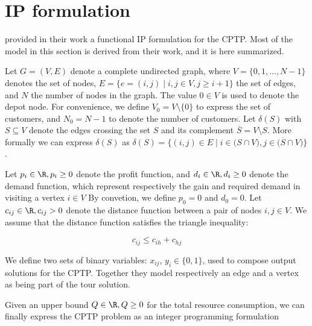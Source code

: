 \chapter{IP formulation}

\cite{Jepsen2014} provided in their work a functional IP formulation for the CPTP.
Most of the model in this section is derived from their work, and it is here summarized.

Let $G = \left(V, E \right)$ denote a complete undirected graph, where $V = \lbrace 0, 1, \dots, N - 1 \rbrace$ denotes the set of nodes,
$E = \lbrace  e = (i, j) \mid i,j \in V, j \ge i + 1 \rbrace$ the set of edges, and $N$ the number of nodes in the graph.
The value $0 \in V$ is used to denote the depot node.
For convenience, we define $V_0 = V \setminus \{0\}$ to express the set of customers, and $N_0 = N - 1$ to denote the number of customers.
Let $\delta(S)$ with $S \subseteq V$ denote the edges crossing the set $S$ and its complement $\overline{S} = V \setminus S$.
More formally we can express $\delta(S)$ as $\delta(S) = \lbrace (i, j) \in E \mid i \in \lparen S \cap V \rparen, j \in \lparen \overline{S} \cap V \rparen \rbrace$.

Let $p_{i} \in \R, p_{i} \ge 0$ denote the profit function, and $d_{i} \in \R, d_{i} \ge 0$ denote the demand function, which represent respectively the gain and required demand in visiting a vertex $i \in V$
By convetion, we define $p_0 = 0$ and $d_0 = 0$.
Let $c_{ij} \in \R, c_{ij} > 0$ denote the distance function between a pair of nodes  $i, j \in V$.
We assume that the distance function satisfies the triangle inequality:

\begin{equation}
	c_{ij} \le c_{ih} + c_{hj}
\end{equation}

We define two sets of binary variables: $x_{ij}$, $y_{i} \in \lbrace 0, 1 \rbrace$, used to compose output solutions for the CPTP.
Together they model respectively an edge and a vertex as being part of the tour solution.

Given an upper bound $Q \in \R,Q \ge 0$ for the total resource consumption, we can finally express the CPTP problem as an integer programming formulation


